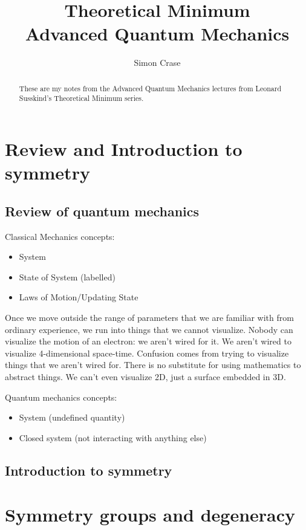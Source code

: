 \documentclass[]{article}
\title{Theoretical Minimum\\Advanced Quantum Mechanics}
\author{Simon Crase}
\begin{document}
\maketitle

\begin{abstract}
These are my notes from the Advanced Quantum Mechanics lectures from Leonard Susskind's Theoretical Minimum series.
\end{abstract}

\tableofcontents

\section{Review and Introduction to symmetry}

\subsection{Review of quantum mechanics}

Classical Mechanics concepts:
\begin{itemize}
	\item System
	\item State of System (labelled)
	\item Laws of Motion/Updating State
\end{itemize}

Once we move outside the range of parameters that we are familiar with from ordinary experience, we run into things that we cannot visualize. Nobody can visualize the motion of an electron: we aren't wired for it. We aren't wired to visualize 4-dimensional space-time. Confusion comes from trying to visualize things that we aren't wired for. There is no substitute for using mathematics to abstract things. We can't even visualize 2D, just a surface embedded in 3D. 

Quantum mechanics concepts:
\begin{itemize}
	\item System (undefined quantity)
	\item Closed system (not interacting with anything else)
\end{itemize}
\subsection{Introduction to symmetry}

\section{Symmetry groups and degeneracy}
\end{document}

